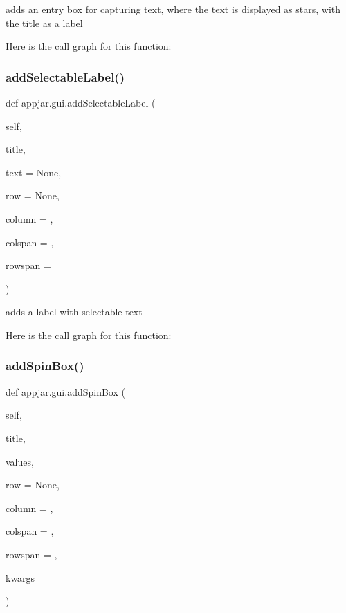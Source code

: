 \begin{DoxyVerb}adds an entry box for capturing text, where the text is displayed as stars, with the title as a label \end{DoxyVerb}
 Here is the call graph for this function\+:
\mbox{\label{classappjar_1_1gui_a8a45e3f03c919beabdd26156d156f959}} 
\subsubsection{\texorpdfstring{add\+Selectable\+Label()}{addSelectableLabel()}}
{\footnotesize\ttfamily def appjar.\+gui.\+add\+Selectable\+Label (\begin{DoxyParamCaption}\item[{}]{self,  }\item[{}]{title,  }\item[{}]{text = {\ttfamily None},  }\item[{}]{row = {\ttfamily None},  }\item[{}]{column = {},  }\item[{}]{colspan = {},  }\item[{}]{rowspan = {} }\end{DoxyParamCaption})}

\begin{DoxyVerb}adds a label with selectable text \end{DoxyVerb}
 Here is the call graph for this function\+:
\mbox{\label{classappjar_1_1gui_a9284aafc1204e8650229c8aea2965da3}} 
\subsubsection{\texorpdfstring{add\+Spin\+Box()}{addSpinBox()}}
{\footnotesize\ttfamily def appjar.\+gui.\+add\+Spin\+Box (\begin{DoxyParamCaption}\item[{}]{self,  }\item[{}]{title,  }\item[{}]{values,  }\item[{}]{row = {\ttfamily None},  }\item[{}]{column = {},  }\item[{}]{colspan = {},  }\item[{}]{rowspan = {},  }\item[{}]{kwargs }\end{DoxyParamCaption})}

